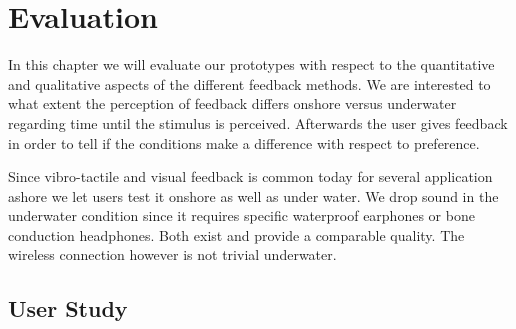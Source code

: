 %

\chapter{Evaluation}
\label{evaluation}

In this chapter we will evaluate our prototypes with respect to the quantitative and qualitative aspects of the different feedback methods. We are interested to what extent the perception of feedback differs onshore versus underwater regarding time until the stimulus is perceived. Afterwards the user gives feedback in order to tell if the conditions make a difference with respect to preference. 


Since vibro-tactile and visual feedback is common today for several application ashore we let users test it onshore as well as under water. We drop sound in the underwater condition since it requires specific waterproof earphones or bone conduction headphones. Both exist and provide a comparable quality. The wireless connection however is not trivial underwater. 

\section{User Study}



